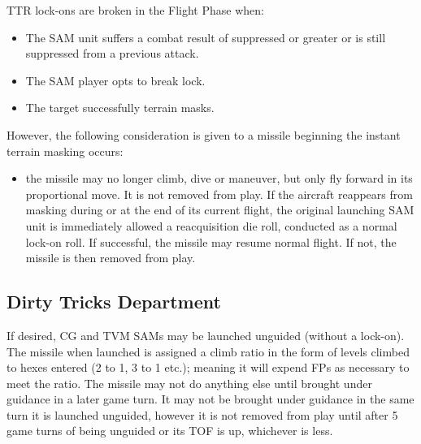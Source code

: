 

TTR lock-ons are broken in the Flight Phase when:
\begin{itemize}

\item The SAM unit suffers a combat result of suppressed or greater or is still suppressed from a previous attack.

\item The SAM player opts to break lock.

\item The target successfully terrain masks.

\end{itemize}

However, the following consideration is given to a missile beginning the instant terrain masking occurs:

\begin{itemize}
\item
the missile may no longer climb, dive or maneuver, but only fly forward in its proportional move. It is not removed from play. If the aircraft reappears from masking during or at the end of its current flight, the original launching SAM unit is immediately allowed a reacquisition die roll, conducted as a normal lock-­on roll. If successful, the missile may resume normal flight. If not, the missile is then removed from play.
\end{itemize}

\subsection{Dirty Tricks Department} If desired, CG and TVM SAMs may be launched unguided (without a lock-on). The missile when launched is assigned a climb ratio in the form of levels climbed to hexes entered (2 to 1, 3 to 1 etc.); meaning it will expend FPs as necessary to meet the ratio. The missile may not do anything else until brought under guidance in a later game turn. It may not be brought under guidance in the same turn it is launched unguided, however it is not removed from play until after 5 game turns of being unguided or its TOF is up,  whichever is less.

